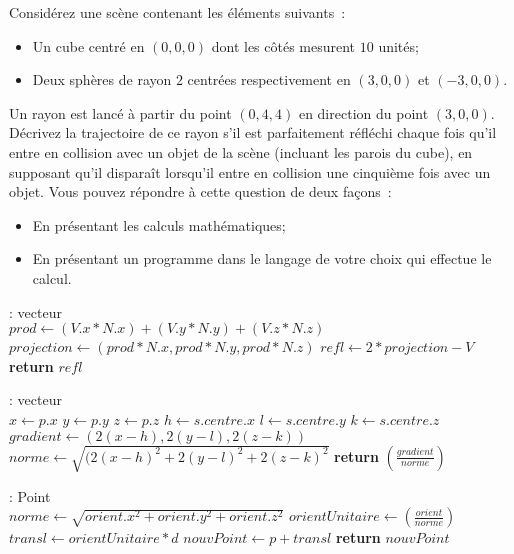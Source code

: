 \documentclass[12pt,addpoints]{exam}
\begin{document}
\begin{questions}
\question[20]
Considérez une scène contenant les éléments suivants~:
\begin{itemize}
  \item Un cube centré en $(0,0,0)$ dont les côtés mesurent $10$ unités;
  \item Deux sphères de rayon $2$ centrées respectivement en $(3,0,0)$ et $(-3,0,0)$.
\end{itemize}
Un rayon est lancé à partir du point $(0,4,4)$ en direction du point $(3,0,0)$. Décrivez la trajectoire de ce rayon s'il est parfaitement réfléchi chaque fois qu'il entre en collision avec un objet de la scène (incluant les parois du cube), en supposant qu'il disparaît lorsqu'il entre en collision une cinquième fois avec un objet. Vous pouvez répondre à cette question de deux façons~:
\begin{itemize}
  \item En présentant les calculs mathématiques;
  \item En présentant un programme dans le langage de votre choix qui effectue le calcul.
\end{itemize}
\begin{solution}
  \begin{algorithmic}[2]
     : {vecteur} \\
      \State $prod \gets (V.x * N.x) + (V.y * N.y) + (V.z * N.z) $
      \State $projection \gets (prod * N.x, prod * N.y, prod * N.z) $
      \State $refl \gets 2 * projection - V$
      \State \textbf{return} $refl$
    \EndFunction

     : {vecteur} \\
      \State $x \gets p.x$
      \State $y \gets p.y$
      \State $z \gets p.z$
      \State $h \gets s.centre.x$
      \State $l \gets s.centre.y$
      \State $k \gets s.centre.z$
      \State $gradient \gets (2(x-h), 2(y-l), 2(z-k))$
      \State $norme \gets \sqrt{(2(x-h)^2 + 2(y-l)^2 + 2(z-k)^2}$
      \State \textbf{return} $ \left( \frac{gradient}{norme} \right)$
    \EndFunction

     : {Point} \\
      \State $norme \gets \sqrt{orient.x^2 + orient.y^2 + orient.z^2}$
      \State $orientUnitaire \gets \left( \frac{orient}{norme} \right)$
      \State $transl \gets orientUnitaire * d$
      \State $nouvPoint \gets p + transl$
      \State \textbf{return} $nouvPoint$
    \EndFunction


\end{algorithmic}
\end{solution}
\end{questions}
\end{document}
